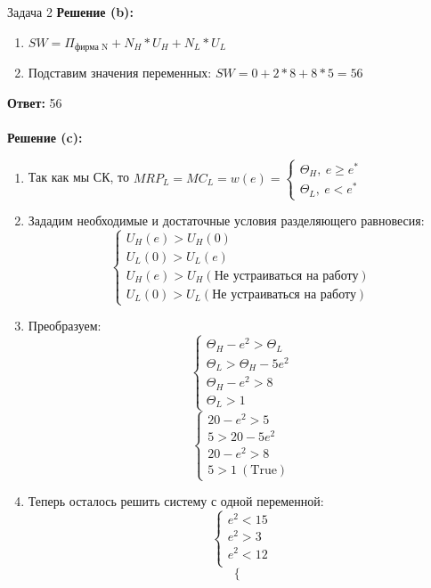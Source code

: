 \begin{mybox}{Задача 2}
    \textbf{Решение (b):}
    \begin{enumerate}
        \item $SW=\Pi_{\text{фирма N}}+N_H*U_H+N_L*U_L$
        \item Подставим значения переменных: $SW=0+2*8+8*5=56$
    \end{enumerate}
    \textbf{Ответ:} 56\\\\
    \textbf{Решение (c):}
    \begin{enumerate}
        \item Так как мы СК, то $MRP_L=MC_L=w(e)=\begin{cases}
            \Theta_H, \ e\geq e^* \\
            \Theta_L, \ e<e^*
        \end{cases}$
        \item Зададим необходимые и достаточные условия разделяющего равновесия: $$\begin{cases}
            U_H(e)>U_H(0) \\
            U_L(0)>U_L(e) \\
            U_H(e)>U_H(\text{Не устраиваться на работу}) \\
            U_L(0)>U_L(\text{Не устраиваться на работу})
        \end{cases}$$
        \item Преобразуем: $$\begin{cases}
            \Theta_H-e^2>\Theta_L \\
            \Theta_L>\Theta_H-5e^2 \\
            \Theta_H-e^2>8 \\
            \Theta_L>1
        \end{cases}$$
        $$\begin{cases}
            20-e^2>5 \\
            5>20-5e^2 \\
            20-e^2>8 \\
            5>1 \ (\text{True})
        \end{cases}$$
        \item Теперь осталось решить систему с одной переменной: $$\begin{cases}
            e^2<15 \\
            e^2>3 \\
            e^2<12 \\
        \end{cases}$$
        $$\begin{cases}

\end{cases}$$
\end{enumerate}
\end{mybox}

